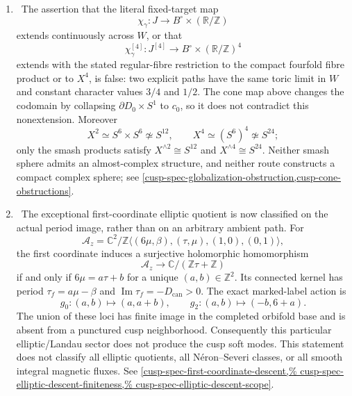\begin{enumerate}[leftmargin=1.8em]
\item \Refuted\ The assertion that the literal fixed-target map
\[
 \chi_\gamma:J\longrightarrow B^\circ\times(\mathbb R/\mathbb Z)
\]
extends continuously across \(W\), or that
\[
 \chi_\gamma^{[4]}:J^{[4]}\longrightarrow
 B^\circ\times(\mathbb R/\mathbb Z)^4
\]
extends with the stated regular-fibre restriction to the compact fourfold
fibre product or to \(X^4\), is false: two explicit paths have the same
toric limit in \(W\) and constant character values \(3/4\) and \(1/2\).
The cone map above changes the codomain by collapsing
\(\partial D_0\times S^1\) to \(c_0\), so it does not contradict this
nonextension.  Moreover
\[
 X^2\simeq S^6\times S^6\not\simeq S^{12},\qquad
 X^4\simeq(S^6)^4\not\simeq S^{24};
\]
only the smash products satisfy
\(X^{\wedge2}\cong S^{12}\) and \(X^{\wedge4}\cong S^{24}\).
Neither smash sphere admits an almost-complex structure, and neither route
constructs a compact complex sphere; see
\cref{cusp-spec-globalization-obstruction,cusp-cone-obstructions}.

\item \Verified\ The exceptional first-coordinate elliptic quotient is now
classified on the actual period image, rather than on an arbitrary ambient
path.  For
\[
 \mathcal A_z=\mathbb C^2/
 \mathbb Z\langle(6\mu,\beta),(\tau,\mu),(1,0),(0,1)\rangle,
\]
the first coordinate induces a surjective holomorphic homomorphism
\[
 \mathcal A_z\longrightarrow\mathbb C/(\mathbb Z\tau+\mathbb Z)
\]
if and only if \(6\mu=a\tau+b\) for a unique
\((a,b)\in\mathbb Z^2\).  Its connected kernel has period
\(\tau_f=a\mu-\beta\) and
\(\operatorname{Im}\tau_f=-D_{\mathrm{can}}>0\).  The exact marked-label
action is
\[
 g_0:(a,b)\mapsto(a,a+b),\qquad
 g_2:(a,b)\mapsto(-b,6+a).
\]
The union of these loci has finite image in the completed orbifold base and
is absent from a punctured cusp neighborhood.  Consequently this particular
elliptic/Landau sector does not produce the cusp soft modes.  This statement
does not classify all elliptic quotients, all N\'eron--Severi classes, or all
smooth integral magnetic fluxes.  See
\cref{cusp-spec-first-coordinate-descent,%
cusp-spec-elliptic-descent-finiteness,%
cusp-spec-elliptic-descent-scope}.


\end{enumerate}

